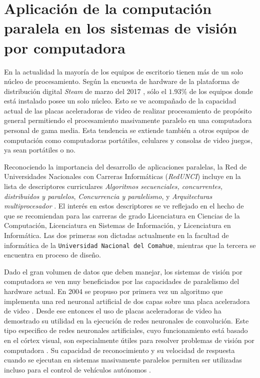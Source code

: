 
\section{Aplicación de la computación paralela en los sistemas de visión por computadora}

\label{algoritmosParalelosYVision}

En la actualidad la mayoría de los equipos de escritorio tienen más de un solo
núcleo de procesamiento. Según la encuesta de hardware de la plataforma de
distribución digital \emph{Steam} de marzo del 2017 \cite{steamSurvey}, sólo
el $1.93$\% de los equipos donde está instalado posee un solo núcleo. Esto se
ve acompañado de la capacidad actual de las placas aceleradoras de video de
realizar procesamiento de propósito general permitiendo el procesamiento
masivamente paralelo en una computadora personal de gama media. Esta tendencia
se extiende también a otros equipos de computación como computadoras
portátiles, celulares y consolas de video juegos, ya sean portátiles o no.

Reconociendo la importancia del desarrollo de aplicaciones paralelas, la Red
de Universidades Nacionales con Carreras Informáticas (\emph{RedUNCI}) incluye
en la lista de descriptores curriculares \emph{Algoritmos secuenciales,
concurrentes, distribuidos y paralelos}, \emph{Concurrencia y paralelismo}, y
\emph{Arquitecturas multiprocesador} \cite{RedUNCI2015}. El interés en estos
descriptores se ve reflejado en el hecho de que se recomiendan para las
carreras de grado Licenciatura en Ciencias de la Computación, Licenciatura en
Sistemas de Información, y Licenciatura en Informática. Las dos primeras son
dictadas actualmente en la facultad de informática de la \texttt{Universidad
Nacional del Comahue}, mientras que la tercera se encuentra en proceso de
diseño.

Dado el gran volumen de datos que deben manejar, los sistemas de visión por
computadora se ven muy beneficiados por las capacidades de paralelismo del
hardware actual. En 2004 se propuso por primera vez un algoritmo que implementa
una red neuronal artificial de dos capas sobre una placa aceleradora de video
\cite{GPUforMLA}. Desde ese entonces el uso de placas aceleradoras de video ha
demostrado su utilidad en la ejecución de redes neuronales de convolución. Este
tipo especifico de redes neuronales artificiales, cuyo funcionamiento está
basado en el córtex visual, son especialmente útiles para resolver problemas de
visión por computadora \cite{usingCCN4IR2015}. Su capacidad de reconocimiento y
su velocidad de respuesta cuando se ejecutan en sistemas masivamente paralelos
permiten ser utilizadas incluso para el control de vehículos autónomos
\cite{e2eLearning4SDC}.


